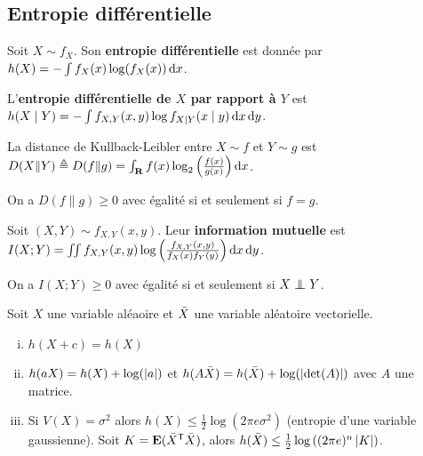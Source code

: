 \subsection{Entropie différentielle}

	\begin{defn}
		Soit $X \sim f_X$.
		Son \textbf{entropie différentielle} est donnée par $h(X) = - \int f_X(x) \log(f_X(x)) \mathop{}\mathopen{}\mathrm{d} x$.
	\end{defn} 

	\begin{defn}
		L'\textbf{entropie différentielle de $X$ par rapport à $Y$} est
		$h(X \mid Y) = - \int f_{X,Y}(x,y) \log f_{X \mid Y}(x \mid y) \mathop{}\mathopen{}\mathrm{d} x \mathop{}\mathopen{}\mathrm{d} y$.
	\end{defn}

	\begin{defn}
		La distance de Kullback-Leibler entre $X \sim f$ et $Y \sim g$ est
		$D(X \| Y) \triangleq D(f \| g) = \int_{\mathbf{R}} f(x) \log_2 \left( \frac{f(x)}{g(x)} \right) \mathop{}\mathopen{}\mathrm{d} x$.
	\end{defn}

	\begin{thm}
		On a $D(f \| g) \geq 0$ avec égalité si et seulement si $f = g$.
	\end{thm}

	\begin{defn}
		Soit $(X,Y) \sim f_{X,Y}(x,y)$.
		Leur \textbf{information mutuelle} est $I(X;Y) = \iint f_{X,Y}(x,y) \log \left( \frac{f_{X,Y}(x,y)}{f_X(x) f_Y(y)} \right) \mathop{}\mathopen{}\mathrm{d} x \mathop{}\mathopen{}\mathrm{d} y$.
	\end{defn}

	\begin{cor}
		On a $I(X;Y) \geq 0$ avec égalité si et seulement si $X \indep Y$.
	\end{cor}

	\begin{thm}
		Soit $X$ une variable aléaoire et $\Bar{X}$ une variable aléatoire vectorielle.
		\begin{enumerate}[(i)]
			\item $h(X + c) = h(X)$
			\item $h(aX) = h(X) + \log(\left\lvert a\right\rvert)$ et $h(A\Bar{X}) = h(\Bar{X}) + \log(\left\lvert\det(A)\right\rvert)$ avec $A$ une matrice.
			\item Si $V(X) = \sigma^2$ alors $h(X) \leq \frac{1}{2} \log(2 \pi e \sigma^2)$ (entropie d'une variable gaussienne).
				Soit $K = \mathbf{E}(\Bar{X}^\mathsf{T} \Bar{X})$, alors $h(\Bar{X}) \leq \frac{1}{2} \log \left( (2 \pi e)^n \left\lvert K\right\rvert \right)$.
		\end{enumerate}
	\end{thm}

